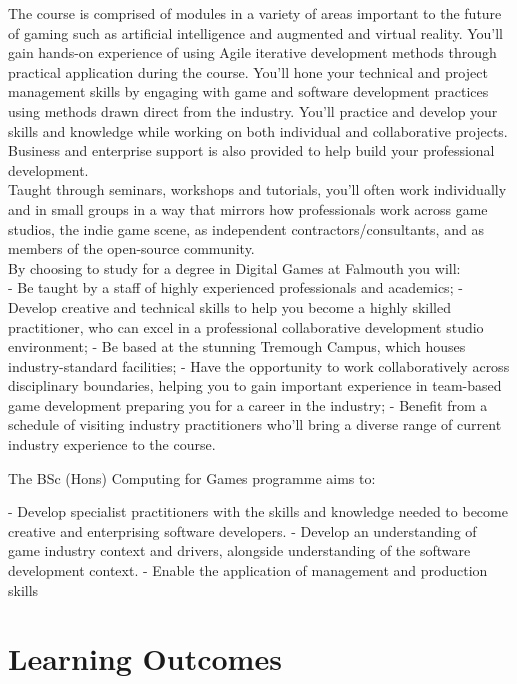 The course is comprised of modules in a variety of areas important to the future of gaming such as artificial intelligence and augmented and virtual reality. You'll gain hands-on experience of using Agile iterative development methods through practical application during the course. You'll hone your technical and project management skills by engaging with game and software development practices using methods drawn direct from the industry. You'll practice and develop your skills and knowledge while working on both individual and collaborative projects. Business and enterprise support is also provided to help build your professional development.\\

Taught through seminars, workshops and tutorials, you'll often work individually and in small groups in a way that mirrors how professionals work across game studios, the indie game scene, as independent contractors/consultants, and as members of the open-source community. \\

By choosing to study for a degree in Digital Games at Falmouth you will:\\

- Be taught by a staff of highly experienced professionals and academics;
- Develop creative and technical skills to help you become a highly skilled practitioner, who can excel in a professional collaborative development studio environment;
- Be based at the stunning Tremough Campus, which houses industry-standard facilities;
- Have the opportunity to work collaboratively across disciplinary boundaries, helping you to gain important experience in team-based game development preparing you for a career in the industry;
- Benefit from a schedule of visiting industry practitioners who'll bring a diverse range of current industry experience to the course.

The BSc (Hons) Computing for Games programme aims to: 

- Develop specialist practitioners with the skills and knowledge needed to become creative and enterprising software developers. 
- Develop an understanding of game industry context and drivers, alongside understanding of the software development context. 
- Enable the application of management and production skills 

\section{Learning Outcomes}

